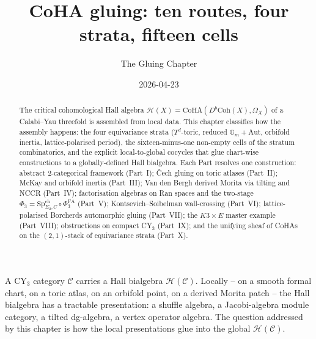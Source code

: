 \documentclass[11pt]{amsart}
\title{CoHA gluing: ten routes, four strata, fifteen cells}
\author{The Gluing Chapter}
\date{2026-04-23}
\theoremstyle{definition}
\providecommand{\CoHA}{\mathrm{CoHA}}
\providecommand{\Coh}{\mathrm{Coh}}
\providecommand{\Aut}{\mathrm{Aut}}
\providecommand{\Gm}{\mathbb{G}_m}
\providecommand{\cH}{\mathcal{H}}
\providecommand{\cC}{\mathcal{C}}
\providecommand{\Db}{D^{b}}
\providecommand{\SpCh}{\mathrm{Sp}^{\mathrm{ch}}}
\providecommand{\PhiFA}{\Phi^{\mathrm{FA}}}
\begin{document}
\maketitle

\begin{abstract}
\noindent
The critical cohomological Hall algebra $\cH(X) = \CoHA(\Db\Coh(X), \Omega_X)$
of a Calabi--Yau threefold is assembled from local data. This chapter classifies
how the assembly happens: the four equivariance strata ($T^d$-toric, reduced
$\Gm + \Aut$, orbifold inertia, lattice-polarised period), the sixteen-minus-one
non-empty cells of the stratum combinatorics, and the explicit local-to-global
cocycles that glue chart-wise constructions to a globally-defined Hall bialgebra.
Each Part resolves one construction: abstract 2-categorical framework (Part~I);
\v{C}ech gluing on toric atlases (Part~II); McKay and orbifold inertia
(Part~III); Van den Bergh derived Morita via tilting and NCCR (Part~IV);
factorisation algebras on Ran spaces and the two-stage $\Phi_3 =
\SpCh_{\Sigma_2, C} \circ \PhiFA_3$ (Part~V); Kontsevich--Soibelman wall-crossing
(Part~VI); lattice-polarised Borcherds automorphic gluing (Part~VII); the
$K3\times E$ master example (Part~VIII); obstructions on compact CY$_3$
(Part~IX); and the unifying sheaf of CoHAs on the $(2,1)$-stack of
equivariance strata (Part~X).
\end{abstract}


A CY$_3$ category $\cC$ carries a Hall bialgebra $\cH(\cC)$. Locally -- on a
smooth formal chart, on a toric atlas, on an orbifold point, on a derived Morita
patch -- the Hall bialgebra has a tractable presentation: a shuffle algebra, a
Jacobi-algebra module category, a tilted dg-algebra, a vertex operator algebra.
The question addressed by this chapter is how the local presentations glue into
the global $\cH(\cC)$.
\end{document}
